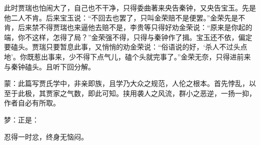 \begin{parag}


    此时贾瑞也怕闹大了，自己也不干净，只得委曲著来央告秦钟，又央告宝玉。先是他二人不肯。后来宝玉说：“不回去也罢了，只叫金荣赔不是便罢。”金荣先是不肯，后来禁不得贾瑞也来逼他去赔不是，李贵等只得好劝金荣说：“原来是你起的端，你不这样，怎得了局？”金荣强不得，只得与秦钟作了揖。宝玉还不依，偏定要磕头。贾瑞只要暂息此事，又悄悄的劝金荣说：“俗语说的好，‘杀人不过头点地’。你既惹出事来，少不得下点气儿，磕个头就完事了。”金荣无奈，只得进前来与秦钟磕头。且听下回分解。
\end{parag}

\begin{parag}

    \begin{note}蒙：此篇写贾氏学中，非亲即族，且学乃大众之规范，人伦之根本。首先悖乱，以至于此极，其贾家之气数，即此可知。挟用袭人之风流，群小之恶逆，一扬一抑，作者自必有所取。\end{note}
\end{parag}


\begin{parag}


    \begin{note}梦：正是：\end{note}
\end{parag}


\begin{parag}


    \begin{note}忍得一时忿，终身无恼闷。\end{note}
\end{parag}

